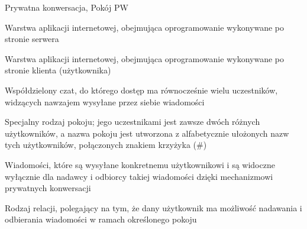 \begin{labeling}{Prywatna konwersacja, Pokój PW}
		\item[Backend] Warstwa aplikacji internetowej, obejmująca oprogramowanie wykonywane
				po stronie serwera
		\item[Frontend] Warstwa aplikacji internetowej, obejmująca oprogramowanie wykonywane
				po stronie klienta (użytkownika)
    \item[Pokój] Współdzielony czat, do którego dostęp ma równocześnie wielu uczestników, widzących nawzajem
        wysyłane przez siebie wiadomości
		\item[Prywatna konwersacja, Pokój PW] Specjalny rodzaj pokoju; jego uczestnikami jest zawsze dwóch różnych użytkowników, a
				nazwa pokoju jest utworzona z alfabetycznie ułożonych nazw tych użytkowników, połączonych znakiem krzyżyka (\#)
    \item[Wiadomości prywatne] Wiadomości, które są wysyłane konkretnemu użytkownikowi i są widoczne wyłącznie
        dla nadawcy i odbiorcy takiej wiadomości dzięki mechanizmowi prywatnych konwersacji
    \item[Wpięcie użytkownika w pokój] Rodzaj relacji, polegający na tym, że dany użytkownik ma możliwość
        nadawania i odbierania wiadomości w ramach określonego pokoju
\end{labeling}
